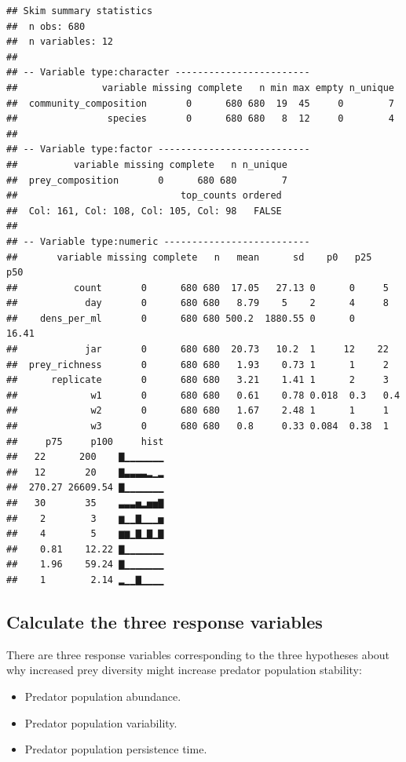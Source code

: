 \documentclass[]{book}
\providecommand{\tightlist}{%
  \setlength{\itemsep}{0pt}\setlength{\parskip}{0pt}}
\begin{document}
\begin{verbatim}
## Skim summary statistics
##  n obs: 680 
##  n variables: 12 
## 
## -- Variable type:character ------------------------
##               variable missing complete   n min max empty n_unique
##  community_composition       0      680 680  19  45     0        7
##                species       0      680 680   8  12     0        4
## 
## -- Variable type:factor ---------------------------
##          variable missing complete   n n_unique
##  prey_composition       0      680 680        7
##                             top_counts ordered
##  Col: 161, Col: 108, Col: 105, Col: 98   FALSE
## 
## -- Variable type:numeric --------------------------
##       variable missing complete   n   mean      sd    p0   p25   p50
##          count       0      680 680  17.05   27.13 0      0     5   
##            day       0      680 680   8.79    5    2      4     8   
##    dens_per_ml       0      680 680 500.2  1880.55 0      0    16.41
##            jar       0      680 680  20.73   10.2  1     12    22   
##  prey_richness       0      680 680   1.93    0.73 1      1     2   
##      replicate       0      680 680   3.21    1.41 1      2     3   
##             w1       0      680 680   0.61    0.78 0.018  0.3   0.4 
##             w2       0      680 680   1.67    2.48 1      1     1   
##             w3       0      680 680   0.8     0.33 0.084  0.38  1   
##     p75     p100     hist
##   22      200    ▇▁▁▁▁▁▁▁
##   12       20    ▇▃▃▃▃▂▁▂
##  270.27 26609.54 ▇▁▁▁▁▁▁▁
##   30       35    ▃▃▃▅▂▅▅▇
##    2        3    ▆▁▁▇▁▁▁▅
##    4        5    ▆▆▁▇▁▇▁▇
##    0.81    12.22 ▇▁▁▁▁▁▁▁
##    1.96    59.24 ▇▁▁▁▁▁▁▁
##    1        2.14 ▂▁▁▇▁▁▁▁
\end{verbatim}

\hypertarget{calculate-the-three-response-variables}{%
\subsection{Calculate the three response variables}\label{calculate-the-three-response-variables}}

There are three response variables corresponding to the three hypotheses about why increased prey diversity might increase predator population stability:

\begin{itemize}
\tightlist
\item
  Predator population abundance.
\item
  Predator population variability.
\item
  Predator population persistence time.
\end{itemize}
\end{document}
